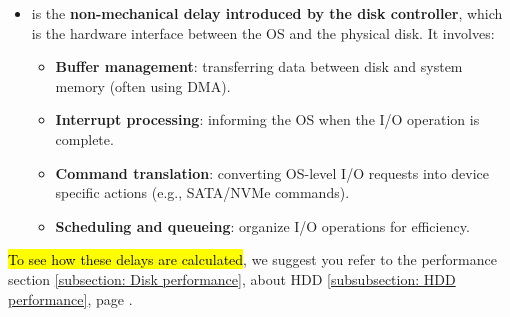 \begin{itemize}
    \item {} is the \textbf{non-mechanical delay introduced by the disk controller}, which is the hardware interface between the OS and the physical disk. It involves:
    \begin{itemize}
        \item \textbf{Buffer management}: transferring data between disk and system memory (often using DMA).
        \item \textbf{Interrupt processing}: informing the OS when the I/O operation is complete.
        \item \textbf{Command translation}: converting OS-level I/O requests into device specific actions (e.g., SATA/NVMe commands).
        \item \textbf{Scheduling and queueing}: organize I/O operations for efficiency.
    \end{itemize}
\end{itemize}
\hl{To see how these delays are calculated}, we suggest you refer to the performance section \ref{subsection: Disk performance}, about HDD \ref{subsubsection: HDD performance}, page \pageref{subsubsection: HDD performance}.


